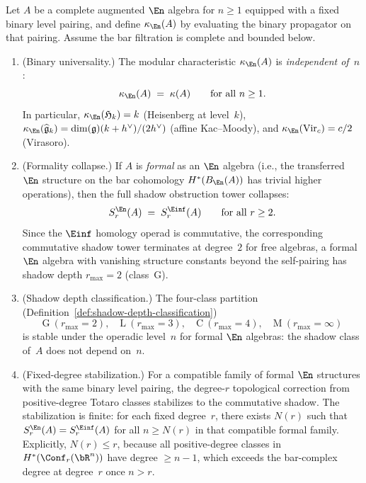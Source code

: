 \begin{theorem}
\label{thm:en-shadow-tower}
Let $A$ be a complete augmented $\En$ algebra for $n \geq 1$ equipped
with a fixed binary level pairing, and define $\kappa_{\En}(A)$ by
evaluating the binary propagator on that pairing. Assume the bar
filtration is complete and bounded below.
\begin{enumerate}[label=\textup{(\roman*)}]
\item \textup{(Binary universality.)}
 The modular characteristic $\kappa_{\En}(A)$ is
 \emph{independent of~$n$}:
 \[
 \kappa_{\En}(A) \;=\; \kappa(A)
 \qquad \text{for all } n \geq 1.
 \]
 In particular,
 $\kappa_{\En}(\mathfrak{H}_k) = k$
 \textup{(}Heisenberg at level~$k$\textup{)},
 $\kappa_{\En}(\widehat{\mathfrak{g}}_k)
 = \dim(\mathfrak{g})(k + h^\vee)/(2h^\vee)$
 \textup{(}affine Kac--Moody\textup{)}, and
 $\kappa_{\En}(\mathrm{Vir}_c) = c/2$
 \textup{(}Virasoro\textup{)}.

\item \textup{(Formality collapse.)}
 If $A$ is \emph{formal} as an $\En$ algebra \textup{(}i.e.,
 the transferred $\En$ structure on the bar cohomology
 $H^*(B_{\En}(A))$ has trivial higher operations\textup{)},
 then the full shadow obstruction tower collapses:
 \[
 S_r^{\En}(A) \;=\; S_r^{\Einf}(A)
 \qquad \text{for all } r \geq 2.
 \]
 Since the $\Einf$ homology operad is commutative, the
 corresponding commutative shadow
 tower terminates at degree~$2$ for free algebras, a formal
 $\En$ algebra with vanishing structure constants beyond the
 self-pairing has shadow depth $r_{\max} = 2$
 \textup{(}class~G\textup{)}.

\item \textup{(Shadow depth classification.)}
 The four-class partition \textup{(}Definition~\textup{\ref{def:shadow-depth-classification})}
 \[
 \mathrm{G}\ (r_{\max} = 2),
 \quad
 \mathrm{L}\ (r_{\max} = 3),
 \quad
 \mathrm{C}\ (r_{\max} = 4),
 \quad
 \mathrm{M}\ (r_{\max} = \infty)
 \]
 is stable under the operadic level~$n$ for formal $\En$ algebras:
 the shadow class of~$A$ does not depend on~$n$.

\item \textup{(Fixed-degree stabilization.)}
 For a compatible family of formal $\En$ structures with the same
 binary level pairing, the degree-$r$ topological correction from
 positive-degree Totaro classes stabilizes to the commutative
 shadow. The stabilization is finite: for each fixed degree~$r$,
 there exists $N(r)$ such that
 $S_r^{\En}(A) = S_r^{\Einf}(A)$ for all $n \geq N(r)$ in that
 compatible formal family.
 Explicitly, $N(r) \leq r$, because all positive-degree classes
 in $H^*(\Conf_r(\bR^n))$ have degree $\geq n - 1$, which
 exceeds the bar-complex degree at degree~$r$ once $n > r$.
\end{enumerate}
\end{theorem}

